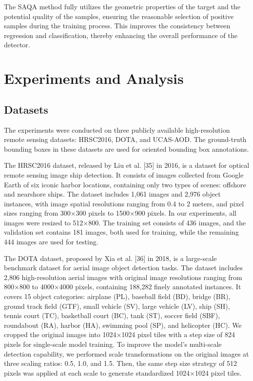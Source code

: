 \documentclass[journal]{IEEEtran}
\begin{document}
The SAQA method fully utilizes the geometric properties of the target and the potential quality of the samples, ensuring the reasonable selection of positive samples during the training process. This improves the consistency between regression and classification, thereby enhancing the overall performance of the detector.

\section{ Experiments and Analysis }

\subsection{ Datasets }

The experiments were conducted on three publicly available high-resolution remote sensing datasets: HRSC2016, DOTA, and UCAS-AOD. The ground-truth bounding boxes in these datasets are used for oriented bounding box annotations.

The HRSC2016 dataset, released by Liu et al. [35] in 2016, is a dataset for optical remote sensing image ship detection. It consists of images collected from Google Earth of six iconic harbor locations, containing only two types of scenes: offshore and nearshore ships. The dataset includes 1,061 images and 2,976 object instances, with image spatial resolutions ranging from 0.4 to 2 meters, and pixel sizes ranging from 300×300 pixels to 1500×900 pixels. In our experiments, all images were resized to 512×800. The training set consists of 436 images, and the validation set contains 181 images, both used for training, while the remaining 444 images are used for testing.

The DOTA dataset, proposed by Xia et al. [36] in 2018, is a large-scale benchmark dataset for aerial image object detection tasks. The dataset includes 2,806 high-resolution aerial images with original image resolutions ranging from 800×800 to 4000×4000 pixels, containing 188,282 finely annotated instances. It covers 15 object categories: airplane (PL), baseball field (BD), bridge (BR), ground track field (GTF), small vehicle (SV), large vehicle (LV), ship (SH), tennis court (TC), basketball court (BC), tank (ST), soccer field (SBF), roundabout (RA), harbor (HA), swimming pool (SP), and helicopter (HC). We cropped the original images into 1024×1024 pixel tiles with a step size of 824 pixels for single-scale model training. To improve the model's multi-scale detection capability, we performed scale transformations on the original images at three scaling ratios: 0.5, 1.0, and 1.5. Then, the same step size strategy of 512 pixels was applied at each scale to generate standardized 1024×1024 pixel tiles.
\end{document}
